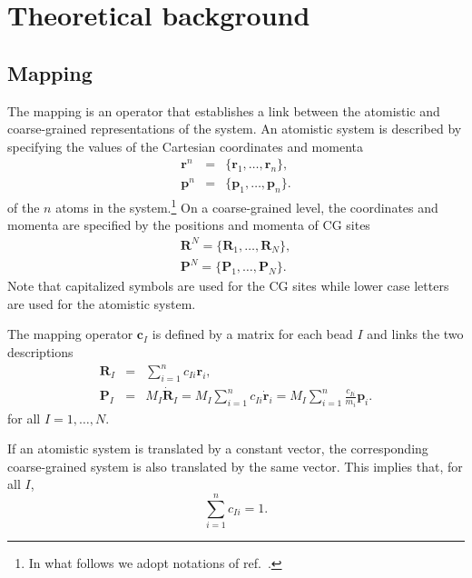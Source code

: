 \chapter{Theoretical background}

\section{Mapping}
\label{sec:mapping_operator}

The mapping is an operator that establishes a link between the atomistic and coarse-grained representations of the system. An atomistic system is described by specifying the values of the Cartesian coordinates and momenta
\begin{eqnarray}
\bm r^n &=& \{\bm r_1,\dots,\bm r_n\}, \\
\bm p^n &=& \{\bm p_1,\dots,\bm p_n\}.
\end{eqnarray}
of the $n$ atoms in the system.\footnote{In what follows we adopt notations of ref.~\cite{Noid:2008.1}.}
%
On a coarse-grained level, the coordinates and momenta are specified by the positions and momenta of CG sites
\begin{eqnarray}
\bm R^N = \{\bm R_1,\dots,\bm R_N\}, \\
\bm P^N = \{\bm P_1,\dots,\bm P_N\}.
\end{eqnarray}
Note that capitalized symbols are used for the CG sites while lower case letters are used for the atomistic system.

The mapping operator ${\bm c}_I$ is defined by a matrix for each bead $I$ and links the two descriptions
\begin{eqnarray}
 {\bm R}_I &=& \sum_{i=1}^{n}c_{Ii}\bm r_i, \\
 {\bm P}_I &=&
 	M_I \dot{{\bm R}}_I =
	M_I \sum_{i=1}^{n}c_{Ii} \dot{{\bm r}}_i =
	M_I \sum_{i=1}^{n} \frac{ c_{Ii}} {m_i} {\bm p}_i .
\label{eq:mapping_scheme}
\end{eqnarray}
for all $I = 1,\dots,N$.

If an atomistic system is translated by a constant vector, the corresponding coarse-grained system is also translated by the same vector. This implies that, for all $I$,
\begin{equation}
 \sum_{i=1}^{n}c_{Ii}=1.
\end{equation}

